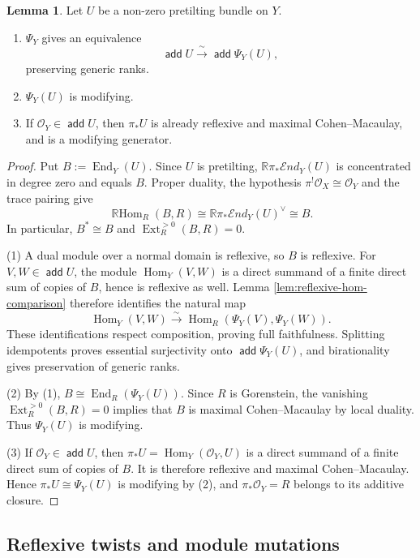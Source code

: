 \documentclass[a4paper,reqno]{amsart}
\def\O{\mathcal{O}}
\DeclareMathOperator{\add}{\mathsf{add}}
\DeclareMathOperator{\Hom}{Hom}
\DeclareMathOperator{\End}{End}
\DeclareMathOperator{\Ext}{Ext}
\DeclareMathOperator{\RHom}{\mathbb{R}Hom}
\theoremstyle{definition}
\newtheorem{Lem}[Thm]{Lemma}
\begin{document}
\begin{Lem}\label{lem:pretilting-endomorphisms}
Let $U$ be a non-zero pretilting bundle on $Y$.
\begin{enumerate}
\item $\Psi_Y$ gives an equivalence
\[
\add U\xrightarrow{\ \sim\ }\add\Psi_Y(U),
\]
preserving generic ranks.
\item $\Psi_Y(U)$ is modifying.
\item If $\O_Y\in\add U$, then $\pi_*U$ is already reflexive and maximal Cohen--Macaulay, and is a modifying generator.
\end{enumerate}
\end{Lem}
\begin{proof}
Put $B:=\End_Y(U)$. Since $U$ is pretilting, $\mathbb R\pi_*\mathcal End_Y(U)$ is concentrated in degree zero and equals $B$. Proper duality, the hypothesis $\pi^!\O_X\cong\O_Y$ and the trace pairing give
\[
\RHom_R(B,R)
\cong\mathbb R\pi_*\mathcal End_Y(U)^\vee
\cong B.
\]
In particular, $B^*\cong B$ and $\Ext_R^{>0}(B,R)=0$.

(1) A dual module over a normal domain is reflexive, so $B$ is reflexive. For $V,W\in\add U$, the module $\Hom_Y(V,W)$ is a direct summand of a finite direct sum of copies of $B$, hence is reflexive as well. Lemma \ref{lem:reflexive-hom-comparison} therefore identifies the natural map
\[
\Hom_Y(V,W)\xrightarrow{\ \sim\ }\Hom_R(\Psi_Y(V),\Psi_Y(W)).
\]
These identifications respect composition, proving full faithfulness. Splitting idempotents proves essential surjectivity onto $\add\Psi_Y(U)$, and birationality gives preservation of generic ranks.

(2) By (1), $B\cong\End_R(\Psi_Y(U))$. Since $R$ is Gorenstein, the vanishing $\Ext_R^{>0}(B,R)=0$ implies that $B$ is maximal Cohen--Macaulay by local duality. Thus $\Psi_Y(U)$ is modifying.

(3) If $\O_Y\in\add U$, then $\pi_*U=\Hom_Y(\O_Y,U)$ is a direct summand of a finite direct sum of copies of $B$. It is therefore reflexive and maximal Cohen--Macaulay. Hence $\pi_*U\cong\Psi_Y(U)$ is modifying by (2), and $\pi_*\O_Y=R$ belongs to its additive closure.
\end{proof}

\subsection{Reflexive twists and module mutations}
\end{document}
